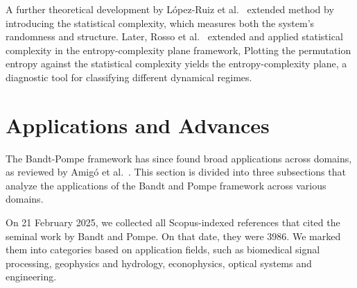 A further theoretical development by López-Ruiz et al.~\cite{lopez1995statistical} extended method by introducing the statistical complexity, which measures both the system's randomness and structure. 
Later, Rosso et al.~\cite{Rosso2007} extended and applied statistical complexity in the entropy-complexity plane framework,
Plotting the permutation entropy against the statistical complexity yields the entropy-complexity plane, a diagnostic tool for classifying different dynamical regimes.

\section{Applications and Advances}


The Bandt-Pompe framework has since found broad applications across domains, as reviewed by Amigó et al.~\cite{amigo2023ordinal}. 
This section is divided into three subsections that analyze the applications of the Bandt and Pompe framework across various domains.

On 21 February 2025, we collected all Scopus-indexed references that cited the seminal work by Bandt and Pompe.
On that date, they were 3986.
We marked them into categories based on application fields, such as biomedical signal processing, geophysics and hydrology, econophysics, optical systems and engineering.


